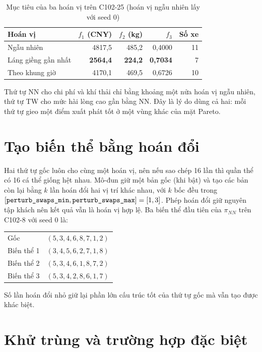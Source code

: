 \begin{table}[H]
\centering
\caption{Mục tiêu của ba hoán vị trên C102-25 (hoán vị ngẫu nhiên lấy với seed 0)}
\label{tab:base-obj}
\begin{tabular}{@{}lrrrr@{}}
\toprule
Hoán vị & $f_1$ (CNY) & $f_2$ (kg) & $f_3$ & Số xe \\
\midrule
Ngẫu nhiên & 4817,5 & 485,2 & 0,4000 & 11 \\
Láng giềng gần nhất & \textbf{2564,4} & \textbf{224,2} & \textbf{0,7034} & 7 \\
Theo khung giờ & 4170,1 & 469,5 & 0,6726 & 10 \\
\bottomrule
\end{tabular}
\end{table}

Thứ tự NN cho chi phí và khí thải chỉ bằng khoảng một nửa hoán vị ngẫu nhiên, thứ tự TW cho mức hài lòng
cao gần bằng NN. Đây là lý do dùng cả hai: mỗi thứ tự gieo một điểm xuất phát tốt ở một vùng khác của
mặt Pareto.

\section{Tạo biến thể bằng hoán đổi}

Hai thứ tự gốc luôn cho cùng một hoán vị, nên nếu sao chép 16 lần thì quần thể có 16 cá thể giống hệt
nhau. Mô-đun giữ một bản gốc (khi  bật) và tạo các bản còn lại bằng $k$ lần hoán
đổi hai vị trí khác nhau, với $k$ bốc đều trong $[\texttt{perturb\_swaps\_min},
\texttt{perturb\_swaps\_max}] = [1, 3]$. Phép hoán đổi giữ nguyên tập khách nên kết quả vẫn là hoán vị hợp
lệ. Ba biến thể đầu tiên của $\pi_{NN}$ trên C102-8 với seed 0 là:
\begin{center}
\begin{tabular}{@{}ll@{}}
Gốc & $(5, 3, 4, 6, 8, 7, 1, 2)$ \\
Biến thể 1 & $(3, 4, 5, 6, 2, 7, 1, 8)$ \\
Biến thể 2 & $(5, 3, 4, 6, 1, 8, 7, 2)$ \\
Biến thể 3 & $(5, 3, 4, 2, 8, 6, 1, 7)$ \\
\end{tabular}
\end{center}
Số lần hoán đổi nhỏ giữ lại phần lớn cấu trúc tốt của thứ tự gốc mà vẫn tạo được khác biệt.

\section{Khử trùng và trường hợp đặc biệt}

